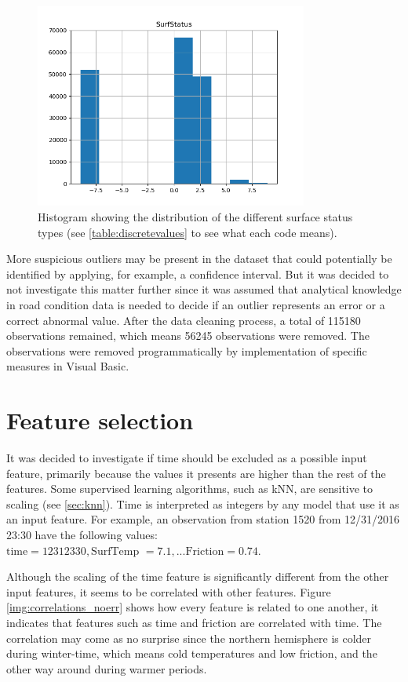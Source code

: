 \begin{figure}[H] 
	\centering
	\includegraphics[width=0.8\textwidth]{media/HistogramSurfaceStatus.png}
	\caption{Histogram showing the distribution of the different surface status types (see \ref{table:discretevalues} to see what each code means).}
	\label{img:histogram_surfstatus}
\end{figure}

	More suspicious outliers may be present in the dataset that could potentially be identified by applying, for example, a confidence interval. But it was decided to not investigate this matter further since it was assumed that analytical knowledge in road condition data is needed to decide if an outlier represents an error or a correct abnormal value. After the data cleaning process, a total of 115180 observations remained, which means 56245 observations were removed. The observations were removed programmatically by implementation of specific measures in Visual Basic.


\section{Feature selection}
	It was decided to investigate if time should be excluded as a possible input feature, primarily because the values it presents are higher than the rest of the features. Some supervised learning algorithms, such as kNN, are sensitive to scaling (see \ref{sec:knn}). Time is interpreted as integers by any model that use it as an input feature. For example, an observation from station 1520 from 12/31/2016 23:30 have the following values: $\text{time} = 12312330, \text{SurfTemp }= 7.1, ... \text{Friction} = 0.74$. 

	Although the scaling of the time feature is significantly different from the other input features, it seems to be correlated with other features. Figure \ref{img:correlations_noerr} shows how every feature is related to one another, it indicates that features such as time and friction are correlated with time. The correlation may come as no surprise since the northern hemisphere is colder during winter-time, which means cold temperatures and low friction, and the other way around during warmer periods. 

